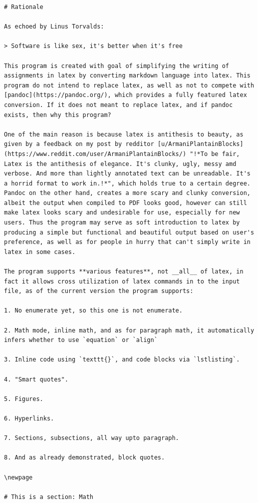 \documentclass[12pt, UTF8]{article}
\begin{document}
\begin{lstlisting}
# Rationale

As echoed by Linus Torvalds:

> Software is like sex, it's better when it's free

This program is created with goal of simplifying the writing of assignments in latex by converting markdown language into latex. This program do not intend to replace latex, as well as not to compete with [pandoc](https://pandoc.org/), which provides a fully featured latex conversion. If it does not meant to replace latex, and if pandoc exists, then why this program?

One of the main reason is because latex is antithesis to beauty, as given by a feedback on my post by redditor [u/ArmaniPlantainBlocks](https://www.reddit.com/user/ArmaniPlantainBlocks/) "!*To be fair, Latex is the antithesis of elegance. It's clunky, ugly, messy amd verbose. And more than lightly annotated text can be unreadable. It's a horrid format to work in.!*", which holds true to a certain degree. Pandoc on the other hand, creates a more scary and clunky conversion, albeit the output when compiled to PDF looks good, however can still make latex looks scary and undesirable for use, especially for new users. Thus the program may serve as soft introduction to latex by producing a simple but functional and beautiful output based on user's preference, as well as for people in hurry that can't simply write in latex in some cases.

The program supports **various features**, not __all__ of latex, in fact it allows cross utilization of latex commands in to the input file, as of the current version the program supports:

1. No enumerate yet, so this one is not enumerate.

2. Math mode, inline math, and as for paragraph math, it automatically infers whether to use `equation` or `align`

3. Inline code using `texttt{}`, and code blocks via `lstlisting`.

4. "Smart quotes".

5. Figures.

6. Hyperlinks.

7. Sections, subsections, all way upto paragraph.

8. And as already demonstrated, block quotes.

\newpage

# This is a section: Math


\end{lstlisting}
\end{document}
